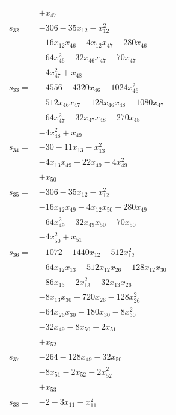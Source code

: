 \begin{longtable}{@{}r@{\;}l@{}}
 & \(\displaystyle +x_{47}\) \\[3pt]
\(s_{32}=\) & \(\displaystyle -306 -35x_{12} -x_{12}^{2}\) \\
 & \(\displaystyle -16x_{12}x_{46} -4x_{12}x_{47} -280x_{46}\) \\
 & \(\displaystyle -64x_{46}^{2} -32x_{46}x_{47} -70x_{47}\) \\
 & \(\displaystyle -4x_{47}^{2} +x_{48}\) \\[3pt]
\(s_{33}=\) & \(\displaystyle -4556 -4320x_{46} -1024x_{46}^{2}\) \\
 & \(\displaystyle -512x_{46}x_{47} -128x_{46}x_{48} -1080x_{47}\) \\
 & \(\displaystyle -64x_{47}^{2} -32x_{47}x_{48} -270x_{48}\) \\
 & \(\displaystyle -4x_{48}^{2} +x_{49}\) \\[3pt]
\(s_{34}=\) & \(\displaystyle -30 -11x_{13} -x_{13}^{2}\) \\
 & \(\displaystyle -4x_{13}x_{49} -22x_{49} -4x_{49}^{2}\) \\
 & \(\displaystyle +x_{50}\) \\[3pt]
\(s_{35}=\) & \(\displaystyle -306 -35x_{12} -x_{12}^{2}\) \\
 & \(\displaystyle -16x_{12}x_{49} -4x_{12}x_{50} -280x_{49}\) \\
 & \(\displaystyle -64x_{49}^{2} -32x_{49}x_{50} -70x_{50}\) \\
 & \(\displaystyle -4x_{50}^{2} +x_{51}\) \\[3pt]
\(s_{36}=\) & \(\displaystyle -1072 -1440x_{12} -512x_{12}^{2}\) \\
 & \(\displaystyle -64x_{12}x_{13} -512x_{12}x_{26} -128x_{12}x_{30}\) \\
 & \(\displaystyle -86x_{13} -2x_{13}^{2} -32x_{13}x_{26}\) \\
 & \(\displaystyle -8x_{13}x_{30} -720x_{26} -128x_{26}^{2}\) \\
 & \(\displaystyle -64x_{26}x_{30} -180x_{30} -8x_{30}^{2}\) \\
 & \(\displaystyle -32x_{49} -8x_{50} -2x_{51}\) \\
 & \(\displaystyle +x_{52}\) \\[3pt]
\(s_{37}=\) & \(\displaystyle -264 -128x_{49} -32x_{50}\) \\
 & \(\displaystyle -8x_{51} -2x_{52} -2x_{52}^{2}\) \\
 & \(\displaystyle +x_{53}\) \\[3pt]
\(s_{38}=\) & \(\displaystyle -2 -3x_{11} -x_{11}^{2}\) \\

\end{longtable}
